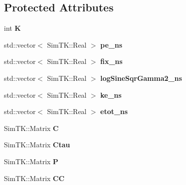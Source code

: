 \subsection*{Protected Attributes}
\begin{DoxyCompactItemize}
\item 
int {\bfseries K}\hypertarget{classLAHMCSampler_a6fb2d8a9f06d161c5a837c8b912f70fa}{}\label{classLAHMCSampler_a6fb2d8a9f06d161c5a837c8b912f70fa}

\item 
std\+::vector$<$ Sim\+T\+K\+::\+Real $>$ {\bfseries pe\+\_\+ns}\hypertarget{classLAHMCSampler_a5cb7b53a7c914eeea1782a571197b835}{}\label{classLAHMCSampler_a5cb7b53a7c914eeea1782a571197b835}

\item 
std\+::vector$<$ Sim\+T\+K\+::\+Real $>$ {\bfseries fix\+\_\+ns}\hypertarget{classLAHMCSampler_a6257e83ae48c3b849f96d0796bd431e9}{}\label{classLAHMCSampler_a6257e83ae48c3b849f96d0796bd431e9}

\item 
std\+::vector$<$ Sim\+T\+K\+::\+Real $>$ {\bfseries log\+Sine\+Sqr\+Gamma2\+\_\+ns}\hypertarget{classLAHMCSampler_add11d937ef56d4bbf0970ac76e958535}{}\label{classLAHMCSampler_add11d937ef56d4bbf0970ac76e958535}

\item 
std\+::vector$<$ Sim\+T\+K\+::\+Real $>$ {\bfseries ke\+\_\+ns}\hypertarget{classLAHMCSampler_a55d8f1378d5200107fdb8f3abc43a354}{}\label{classLAHMCSampler_a55d8f1378d5200107fdb8f3abc43a354}

\item 
std\+::vector$<$ Sim\+T\+K\+::\+Real $>$ {\bfseries etot\+\_\+ns}\hypertarget{classLAHMCSampler_a6992320ce81d608b84fdea4386b43fbd}{}\label{classLAHMCSampler_a6992320ce81d608b84fdea4386b43fbd}

\item 
Sim\+T\+K\+::\+Matrix {\bfseries C}\hypertarget{classLAHMCSampler_a73138f7fd34e877e393f0409afeffbe1}{}\label{classLAHMCSampler_a73138f7fd34e877e393f0409afeffbe1}

\item 
Sim\+T\+K\+::\+Matrix {\bfseries Ctau}\hypertarget{classLAHMCSampler_a7e9132c332389e404a409d4abb75125b}{}\label{classLAHMCSampler_a7e9132c332389e404a409d4abb75125b}

\item 
Sim\+T\+K\+::\+Matrix {\bfseries P}\hypertarget{classLAHMCSampler_a3a815eae4e31199eae811722b00a6306}{}\label{classLAHMCSampler_a3a815eae4e31199eae811722b00a6306}

\item 
Sim\+T\+K\+::\+Matrix {\bfseries CC}\hypertarget{classLAHMCSampler_ae6bab0d320d3b9d90e26b7cbbb9ace44}{}\label{classLAHMCSampler_ae6bab0d320d3b9d90e26b7cbbb9ace44}

\end{DoxyCompactItemize}
